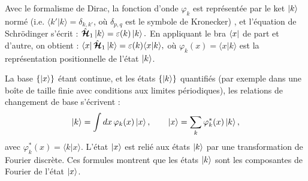 Avec le formalisme de Dirac, la fonction d’onde $\varphi_k$ est représentée par le ket $\ket{k}$ normé (i.e. $\langle k' \vert k \rangle = \delta_{k, k'}$, où $\delta_{p,q}$ est le symbole de Kronecker)
, et l’équation de Schrödinger s’écrit :
\(
\hat{\bm{\mathcal{H}}}_1 \ket{k} = \varepsilon(k) \ket{k}.
\)
En appliquant le bra $\bra{x}$ de part et d’autre, on obtient :
\(
\bra{x} \hat{\bm{\mathcal{H}}}_1 \ket{k} = \varepsilon(k) \langle x \vert k \rangle,
\)
où $\varphi_k(x) = \langle x \vert k \rangle$ est la représentation positionnelle de l’état $\ket{k}$.




\begin{mdframed}[
	linewidth=0.5pt, 
	backgroundcolor=gray!5, 
	roundcorner=50pt,	
	innerleftmargin=5pt,
    innerrightmargin=5pt,
    innertopmargin=1pt,
    innerbottommargin=2pt,
    leftmargin=2pt,
    rightmargin=2pt
	]
La base $\{\ket{x}\}$ étant continue, et les états $\{\ket{k}\}$ quantifiés (par exemple dans une boîte de taille finie avec conditions aux limites périodiques), les relations de changement de base s’écrivent :
\begin{eqnarray}
	\ket{k} = \int dx \, \varphi_k(x) \ket{x}, \qquad   
	\ket{x} = \sum_k \varphi_k^\ast(x) \ket{k},
\end{eqnarray}
avec $\varphi_k^\ast(x) = \langle k \vert x \rangle$. L’état $\ket{x}$ est relié aux états $\ket{k}$ par une transformation de Fourier discrète. Ces formules montrent que les états $\ket{k}$ sont les composantes de Fourier de l’état $\ket{x}$.
\end{mdframed}






